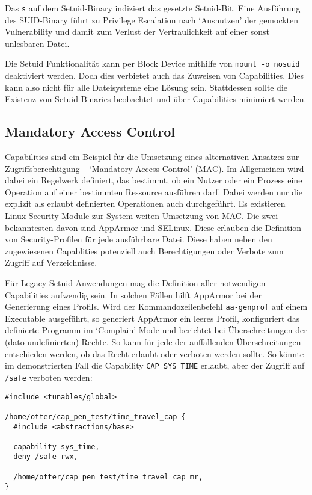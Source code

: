 Das \texttt{s} auf dem Setuid-Binary indiziert das gesetzte Setuid-Bit. Eine Ausführung des SUID-Binary führt zu Privilege Escalation nach `Ausnutzen' der gemockten Vulnerability und damit zum Verlust der Vertraulichkeit auf einer sonst unlesbaren Datei.

Die Setuid Funktionalität kann per Block Device mithilfe von \texttt{mount -o nosuid} deaktiviert werden. Doch dies verbietet auch das Zuweisen von Capabilities. Dies kann also nicht für alle Dateisysteme eine Lösung sein. Stattdessen sollte
die Existenz von Setuid-Binaries beobachtet und über Capabilities minimiert werden.

\subsection{Mandatory Access Control}

Capabilities sind ein Beispiel für die Umsetzung eines alternativen Ansatzes zur Zugriffsberechtigung -- `Mandatory Access Control' (MAC). Im Allgemeinen wird dabei ein Regelwerk definiert, das bestimmt, ob ein Nutzer oder ein Prozess eine Operation auf einer bestimmten Ressource ausführen darf. Dabei werden nur die explizit als erlaubt definierten Operationen auch durchgeführt. Es existieren Linux Security Module zur System-weiten Umsetzung von MAC. Die zwei bekanntesten davon
sind AppArmor und SELinux. Diese erlauben die Definition von Security-Profilen für jede ausführbare Datei. Diese haben neben den zugewiesenen Capablities potenziell auch Berechtigungen oder Verbote zum Zugriff auf Verzeichnisse.

Für Legacy-Setuid-Anwendungen mag die Definition aller notwendigen Capabilities aufwendig sein. In solchen Fällen hilft AppArmor bei der Generierung eines Profils. Wird der Kommandozeilenbefehl \texttt{aa-genprof} auf einem Executable ausgeführt, so generiert
AppArmor ein leeres Profil, konfiguriert das definierte Programm im `Complain'-Mode und berichtet bei Überschreitungen der (dato undefinierten) Rechte. So kann für jede der auffallenden Überschreitungen entschieden werden, ob das Recht erlaubt oder verboten werden sollte. So könnte im demonstrierten Fall die Capability \texttt{CAP\_SYS\_TIME} erlaubt, aber der Zugriff auf \texttt{/safe} verboten werden:

\begin{lstlisting}
#include <tunables/global>

/home/otter/cap_pen_test/time_travel_cap {
  #include <abstractions/base>

  capability sys_time,
  deny /safe rwx,

  /home/otter/cap_pen_test/time_travel_cap mr,
}
\end{lstlisting}

